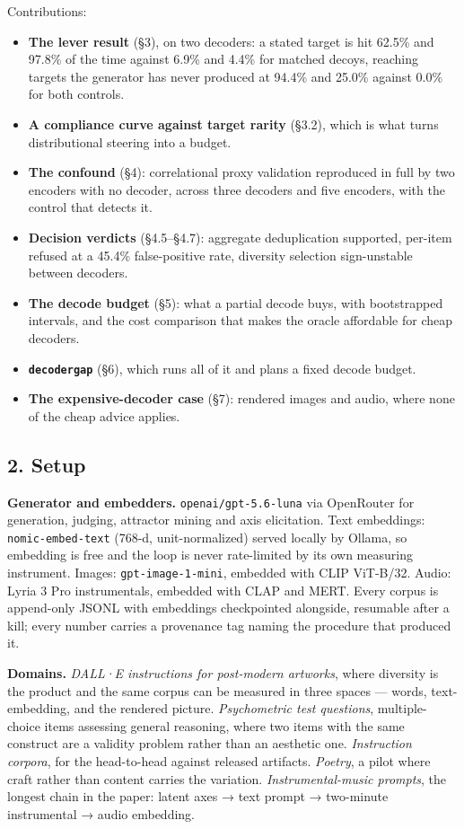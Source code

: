 \documentclass[
  10pt,
]{article}
\providecommand{\tightlist}{%
  \setlength{\itemsep}{0pt}\setlength{\parskip}{0pt}}
\theoremstyle{plain}
\theoremstyle{definition}
\providecommand{\tightlist}{\setlength{\itemsep}{0pt}\setlength{\parskip}{0pt}}
\begin{document}
Contributions:

\begin{itemize}
\tightlist
\item
  \textbf{The lever result} (§3), on two decoders: a stated target is
  hit 62.5\% and 97.8\% of the time against 6.9\% and 4.4\% for matched
  decoys, reaching targets the generator has never produced at 94.4\%
  and 25.0\% against 0.0\% for both controls.
\item
  \textbf{A compliance curve against target rarity} (§3.2), which is
  what turns distributional steering into a budget.
\item
  \textbf{The confound} (§4): correlational proxy validation reproduced
  in full by two encoders with no decoder, across three decoders and
  five encoders, with the control that detects it.
\item
  \textbf{Decision verdicts} (§4.5--§4.7): aggregate deduplication
  supported, per-item refused at a 45.4\% false-positive rate, diversity
  selection sign-unstable between decoders.
\item
  \textbf{The decode budget} (§5): what a partial decode buys, with
  bootstrapped intervals, and the cost comparison that makes the oracle
  affordable for cheap decoders.
\item
  \textbf{\texttt{decodergap}} (§6), which runs all of it and plans a
  fixed decode budget.
\item
  \textbf{The expensive-decoder case} (§7): rendered images and audio,
  where none of the cheap advice applies.
\end{itemize}

\subsection{2. Setup}\label{2-setup}

\textbf{Generator and embedders.} \texttt{openai/gpt-5.6-luna} via
OpenRouter for generation, judging, attractor mining and axis
elicitation. Text embeddings: \texttt{nomic-embed-text} (768-d,
unit-normalized) served locally by Ollama, so embedding is free and the
loop is never rate-limited by its own measuring instrument. Images:
\texttt{gpt-image-1-mini}, embedded with CLIP ViT-B/32. Audio: Lyria 3
Pro instrumentals, embedded with CLAP and MERT. Every corpus is
append-only JSONL with embeddings checkpointed alongside, resumable
after a kill; every number carries a provenance tag naming the procedure
that produced it.

\textbf{Domains.} \emph{DALL·E instructions for post-modern artworks},
where diversity is the product and the same corpus can be measured in
three spaces --- words, text-embedding, and the rendered picture.
\emph{Psychometric test questions}, multiple-choice items assessing
general reasoning, where two items with the same construct are a
validity problem rather than an aesthetic one. \emph{Instruction
corpora}, for the head-to-head against released artifacts.
\emph{Poetry}, a pilot where craft rather than content carries the
variation. \emph{Instrumental-music prompts}, the longest chain in the
paper: latent axes → text prompt → two-minute instrumental → audio
embedding.
\end{document}
